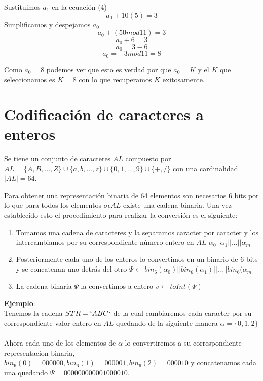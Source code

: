 Sustituimos $a_1$ en la ecuación (4) 
\begin{equation}
 a_0+10(5)=3
\end{equation}
Simplificamos y despejamos $a_0$
\begin{equation}
 a_0+(50mod11)=3
\end{equation}
\begin{equation}
 a_0+6=3
\end{equation}
\begin{equation}
 a_0=3-6
\end{equation}
\begin{equation}
 a_0=-3mod11=8
\end{equation}

Como $a_0=8$ podemos ver que esto es verdad por que $a_0=K$ y el $K$ que seleccionamos es $K=8$ con lo que recuperamos $K$ exitosamente.


\section{Codificaci\'on de caracteres a enteros}
Se tiene un conjunto de caracteres $AL$ compuesto por $AL=\{A,B,...,Z\}\cup\{a,b,...,z\}\cup\{0,1,...,9\}\cup\{+,/\}$ con una cardinalidad $|AL|=64$.

Para obtener una representación binaria de 64 elementos son necesarios 6 bits por lo que para todos los elementos $\sigma\epsilon AL$ existe una cadena binaria. Una vez establecido esto el procedimiento para realizar la conversión es el siguiente:
\begin{enumerate}
 \item Tomamos una cadena de caracteres y la separamos caracter por caracter y los intercambiamos por su correspondiente número entero en $AL$ $\alpha _0||\alpha _1||...||\alpha _m$
 \item Posteriormente cada uno de los enteros lo convertimos en un binario de 6 bits y se concatenan uno detrás del otro $\Psi\longleftarrow bin_6(\alpha _0)||bin_6(\alpha _1)||...||bin_6(\alpha _m$
 \item La cadena binaria $\Psi$ la convertimos a entero $v\longleftarrow toInt(\Psi)$
\end{enumerate}
\textbf{Ejemplo}:\\
Tenemos la cadena $STR=`ABC`$ de la cual cambiaremos cada caracter por su correspondiente valor entero en $AL$ quedando de la siguiente manera $\alpha =\{0,1,2\}$
\\ 
\\
Ahora cada  uno de los elementos de $\alpha$ lo convertiremos a su correspondiente representacion binaria, $bin_6(0)=000000, bin_6(1)=000001, bin_6(2)=000010$ y concatenamos cada una quedando $\Psi = 000000000001000010$. 


